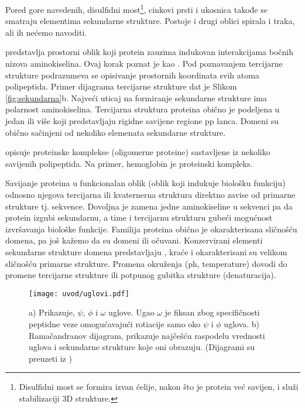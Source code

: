 Pored gore navedenih, disulfidni most\footnote{
  Disulfidni most se formira izvan ćelije, nakon što je protein  već savijen, i
  služi stabilizaciji 3D strukture.
},
cinkovi prsti i ukosnica takođe se smatraju elementima sekundarne strukture.
Postoje i drugi oblici spirala i traka, ali ih nećemo navoditi.




 predstavlja prostorni oblik koji protein zauzima
indukovan interakcijama bočnih nizova aminokiselina. Ovaj korak poznat je kao
 .  Pod poznavanjem tercijarne strukture 
podrazumeva se opisivanje prostornih koordinata svih atoma polipeptida. Primer dijagrama
tercijarne strukture dat je Slikom \ref{fig:sekundarna}b.
Najveći uticaj na formiranje sekundarne strukture ima polarnost aminokiselina.
Tercijarna struktura proteina obično je podeljena u jedan ili više
 koji predstavljaju rigidne savijene regione pp lanca.  Domeni
su obično sačinjeni od nekoliko elemenata sekundarne strukture.

 opisuje proteinske komplekse (oligomerne proteine) sastavljene
iz nekoliko savijenih polipeptida. Na primer, hemoglobin je proteinski kompleks.

Savijanje proteina u funkcionalan oblik (oblik koji indukuje biološku funkciju)
odnosno njegova tercijarna ili kvaternerna struktura direktno zavise od
primarne strukture tj. sekvence. Dovoljna je zamena jedne aminokiseline u sekvenci
pa da protein izgubi sekundarnu, a time i tercijarnu strukturu gubeći mogućnost
izvršavanja biološke funkcije. Familija proteina obično je okarakterisana
sličnošću domena, pa još kažemo da su domeni  ili očuvani.
Konzervirani elementi sekundarne strukture domena predstavljaju
, kraće  i okarakterisani su velikom
sličnošću primarne strukture. Promena okruženja (ph, temperature) dovodi do promene
tercijarne strukture ili potpunog gubitka strukture (denaturacija).


\begin{figure}[th]
\centering
\texttt{[image: uvod/uglovi.pdf]}
\caption {
  \footnotesize
  a) Prikazuje, $\psi$, $\phi$ i $\omega$ uglove. Ugao $\omega$ je fiksan
  zbog specifičnosti peptidne veze omogućavajući rotiacije samo oko
  $\psi$ i $\phi$ uglova.
  b) Ramačandranov dijagram, prikazuje najčešću raspodelu vrednosti uglova
  i sekundarne strukture koje oni obrazuju.
  (Dijagrami su preuzeti iz \cite{Bioinformatics2007})
}
\label{fig:uglovi}
\end{figure}


